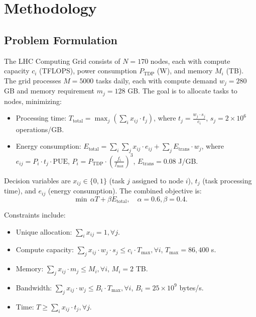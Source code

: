 \documentclass[a4paper,11pt]{article}
\begin{document}
\section{Methodology}

\subsection{Problem Formulation}
The LHC Computing Grid consists of $N=170$ nodes, each with compute capacity $c_i$ (TFLOPS), power consumption $P_{\text{TDP}}$ (W), and memory $M_i$ (TB). The grid processes $M=5000$ tasks daily, each with compute demand $w_j=280$ GB and memory requirement $m_j=128$ GB. The goal is to allocate tasks to nodes, minimizing:

\begin{itemize}
    \item Processing time: $T_{\text{total}} = \max_j \left( \sum_i x_{ij} \cdot t_j \right)$, where $t_j = \frac{w_j \cdot s_j}{c_i}$, $s_j = 2 \times 10^6$ operations/GB.
    \item Energy consumption: $E_{\text{total}} = \sum_i \sum_j x_{ij} \cdot e_{ij} + \sum_j E_{\text{trans}} \cdot w_j$, where $e_{ij} = P_i \cdot t_j \cdot \text{PUE}$, $P_i = P_{\text{TDP}} \cdot \left( \frac{f_i}{f_{\text{max}}} \right)^3$, $E_{\text{trans}} = 0.08$ J/GB.
\end{itemize}

Decision variables are $x_{ij} \in \{0, 1\}$ (task $j$ assigned to node $i$), $t_j$ (task processing time), and $e_{ij}$ (energy consumption). The combined objective is:
\begin{equation}
\min \, \alpha T + \beta E_{\text{total}}, \quad \alpha = 0.6, \beta = 0.4.
\end{equation}

Constraints include:
\begin{itemize}
    \item Unique allocation: $\sum_i x_{ij} = 1, \forall j$.
    \item Compute capacity: $\sum_j x_{ij} \cdot w_j \cdot s_j \leq c_i \cdot T_{\text{max}}, \forall i$, $T_{\text{max}} = 86,400$ s.
    \item Memory: $\sum_j x_{ij} \cdot m_j \leq M_i, \forall i$, $M_i = 2$ TB.
    \item Bandwidth: $\sum_j x_{ij} \cdot w_j \leq B_i \cdot T_{\text{max}}, \forall i$, $B_i = 25 \times 10^9$ bytes/s.
    \item Time: $T \geq \sum_i x_{ij} \cdot t_j, \forall j$.
\end{itemize}
\end{document}
